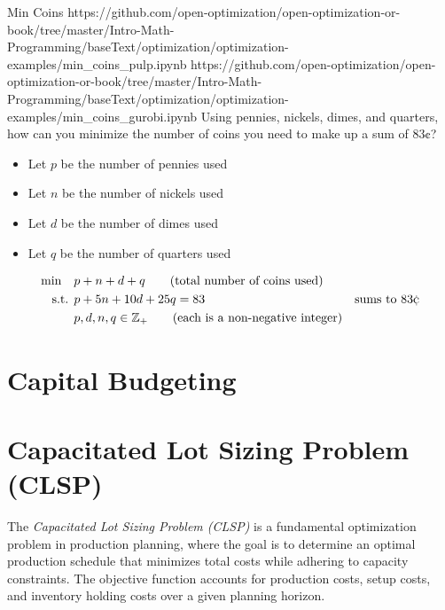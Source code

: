\begin{examplewithallcode}{Min Coins}
{}
{https://github.com/open-optimization/open-optimization-or-book/tree/master/Intro-Math-Programming/baseText/optimization/optimization-examples/min_coins_pulp.ipynb}
{https://github.com/open-optimization/open-optimization-or-book/tree/master/Intro-Math-Programming/baseText/optimization/optimization-examples/min_coins_gurobi.ipynb}
\label{ex:min-coins}
Using pennies, nickels, dimes, and quarters, how can you minimize the number of coins you need to make up a sum of $83\cent$? 

\begin{itemize}
\item Let $p$ be the number of pennies used
\item Let $n$ be the number of nickels used
\item Let $d$ be the number of dimes used
\item Let $q$ be the number of quarters used
\end{itemize}
\begin{align*}
\min \quad & p + n + d + q   \tag{total number of coins used} \\
\st        & p + 5n + 10d + 25 q = 83 & \text{sums to } 83 \cent \\
& p,d,n,q \in \Z_+   \tag{each is a non-negative integer}
\end{align*}
\end{examplewithallcode}

\section{Capital Budgeting}
\label{sec:capital-budgeting}



\section{Capacitated Lot Sizing Problem (CLSP)}

The \textit{Capacitated Lot Sizing Problem (CLSP)} is a fundamental optimization problem in production planning, where the goal is to determine an optimal production schedule that minimizes total costs while adhering to capacity constraints. The objective function accounts for production costs, setup costs, and inventory holding costs over a given planning horizon.

